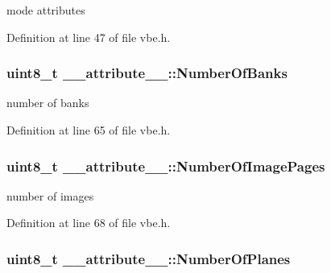 mode attributes 



Definition at line 47 of file vbe.\+h.

\hypertarget{struct____attribute_____a59483378dd87414afcde6cb3ca93c2d8}{}
\subsubsection[{Number\+Of\+Banks}]{\setlength{\rightskip}{0pt plus 5cm}uint8\+\_\+t \+\_\+\+\_\+attribute\+\_\+\+\_\+\+::\+Number\+Of\+Banks}\label{struct____attribute_____a59483378dd87414afcde6cb3ca93c2d8}


number of banks 



Definition at line 65 of file vbe.\+h.

\hypertarget{struct____attribute_____a988714bc16626547fbdc31f25dfa6470}{}
\subsubsection[{Number\+Of\+Image\+Pages}]{\setlength{\rightskip}{0pt plus 5cm}uint8\+\_\+t \+\_\+\+\_\+attribute\+\_\+\+\_\+\+::\+Number\+Of\+Image\+Pages}\label{struct____attribute_____a988714bc16626547fbdc31f25dfa6470}


number of images 



Definition at line 68 of file vbe.\+h.

\hypertarget{struct____attribute_____ab1471d2f75e61117d65290da9070cf89}{}
\subsubsection[{Number\+Of\+Planes}]{\setlength{\rightskip}{0pt plus 5cm}uint8\+\_\+t \+\_\+\+\_\+attribute\+\_\+\+\_\+\+::\+Number\+Of\+Planes}\label{struct____attribute_____ab1471d2f75e61117d65290da9070cf89}


